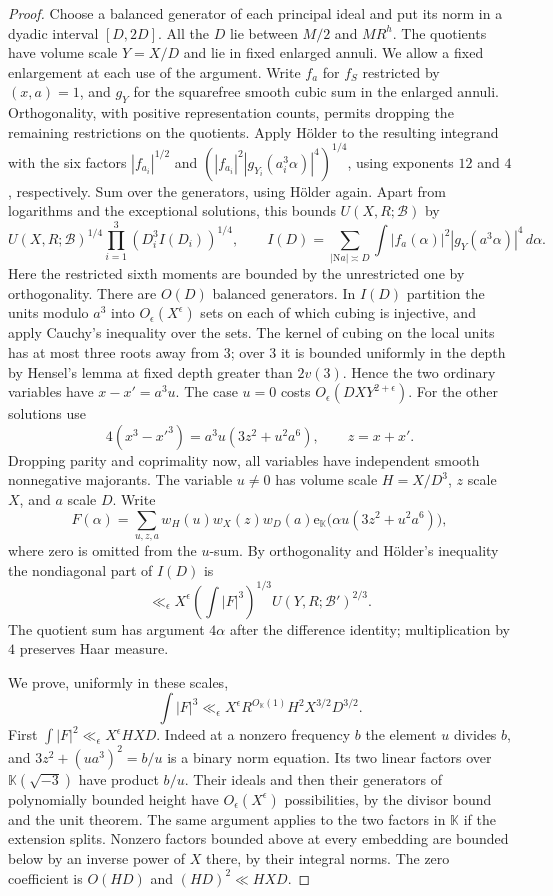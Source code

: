 \documentclass[11pt,letterpaper]{article}
\theoremstyle{definition}
\numberwithin{equation}{section}
\begin{document}
\begin{proof}
Choose a balanced generator of each principal ideal and put its norm
in a dyadic interval $[D,2D]$. All the $D$ lie between $M/2$ and
$MR^h$. The quotients have volume scale $Y=X/D$ and lie in fixed
enlarged annuli. We allow a fixed enlargement at each use of the
argument. Write $f_a$ for $f_S$ restricted by $(x,a)=1$, and $g_Y$
for the squarefree smooth cubic sum in the enlarged annuli.
Orthogonality, with positive representation counts, permits
dropping the remaining restrictions on the quotients. Apply H\"older
to the resulting integrand with the six factors
$|f_{a_i}|^{1/2}$ and
$(|f_{a_i}|^2|g_{Y_i}(a_i^3\alpha)|^4)^{1/4}$, using exponents
$12$ and $4$, respectively. Sum over the generators, using H\"older
again. Apart from logarithms and the exceptional solutions, this
bounds $U(X,R;\mathcal B)$ by
\[
 U(X,R;\mathcal B)^{1/4}
 \prod_{i=1}^3 (D_i^3 I(D_i))^{1/4},\qquad
 I(D)=\sum_{|\mathrm N a|\asymp D}
      \int |f_a(\alpha)|^2 |g_Y(a^3\alpha)|^4\,d\alpha .
\]
Here the restricted sixth moments are bounded by the unrestricted
one by orthogonality. There are $O(D)$ balanced generators.
In $I(D)$ partition the units modulo $a^3$ into
$O_\epsilon(X^\epsilon)$ sets on each of which cubing is injective,
and apply Cauchy's inequality over the sets. The kernel of cubing
on the local units has at most three roots away from $3$; over
$3$ it is bounded uniformly in the depth by Hensel's lemma at
fixed depth greater than $2v(3)$. Hence the two ordinary variables
have $x-x'=a^3 u$. The case $u=0$ costs
$O_\epsilon(DXY^{2+\epsilon})$. For the other solutions use
\[
      4(x^3-x'^3)=a^3u(3z^2+u^2a^6),\qquad z=x+x'.
\]
Dropping parity and coprimality now, all variables have independent
smooth nonnegative majorants. The variable $u\ne0$ has volume scale
$H=X/D^3$, $z$ scale $X$, and $a$ scale $D$. Write
\[
 F(\alpha)=\sum_{u,z,a} w_H(u) w_X(z)w_D(a)
       \mathrm e_{\mathbb K}\bigl(\alpha u(3z^2+u^2a^6)\bigr),
\]
where zero is omitted from the $u$-sum. By orthogonality and
H\"older's inequality the nondiagonal part of $I(D)$ is
\[
 \ll_\epsilon X^\epsilon (\textstyle\int|F|^3)^{1/3}
                      U(Y,R;\mathcal B')^{2/3}.
\] The quotient sum has argument $4\alpha$ after the difference identity; multiplication by $4$ preserves Haar measure.

We prove, uniformly in these scales,
\begin{equation}\label{nf3:smoothaux}
        \int |F|^3 \ll_\epsilon X^{\epsilon}R^{O_{\mathbb K}(1)}
                           H^2 X^{3/2}D^{3/2}.
\end{equation}
First $\int|F|^2\ll_\epsilon X^\epsilon HXD$.
Indeed at a nonzero frequency $b$ the element $u$ divides $b$,
and $3z^2+(ua^3)^2=b/u$ is a binary norm equation. Its two
linear factors over $\mathbb K(\sqrt{-3})$ have product $b/u$.
Their ideals and then their generators of polynomially bounded height
have $O_\epsilon(X^\epsilon)$ possibilities, by the divisor bound
and the unit theorem. The same argument applies to the two factors
in $\mathbb K$ if the extension splits. Nonzero factors bounded
above at every embedding are bounded below by an inverse power of
$X$ there, by their integral norms. The zero coefficient is
$O(HD)$ and $(HD)^2\ll HXD$.


\end{proof}
\end{document}
